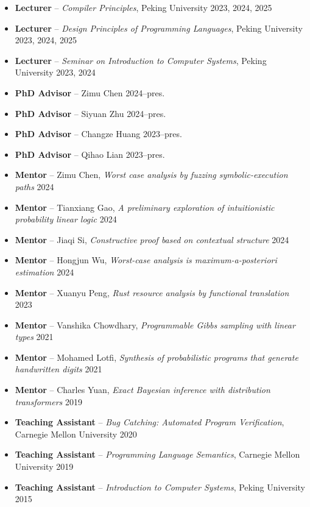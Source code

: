 \documentclass[11pt,letterpaper,sans]{moderncv}        %
\begin{document}
\begin{itemize}
  \item \textbf{Lecturer} -- \emph{Compiler Principles}, Peking University \hfill 2023, 2024, 2025
  \item \textbf{Lecturer} -- \emph{Design Principles of Programming Languages}, Peking University \hfill 2023, 2024, 2025
  \item \textbf{Lecturer} -- \emph{Seminar on Introduction to Computer Systems}, Peking University \hfill 2023, 2024

  \vspace{4pt}

  \item \textbf{PhD Advisor} -- Zimu Chen \hfill 2024--pres.
  \item \textbf{PhD Advisor} -- Siyuan Zhu \hfill 2024--pres.
  \item \textbf{PhD Advisor} -- Changze Huang \hfill 2023--pres.
  \item \textbf{PhD Advisor} -- Qihao Lian \hfill 2023--pres.

  \vspace{4pt}

  \item \textbf{Mentor} -- Zimu Chen, \emph{Worst case analysis by fuzzing symbolic-execution paths} \hfill 2024
  \item \textbf{Mentor} -- Tianxiang Gao, \emph{A preliminary exploration of intuitionistic probability linear logic} \hfill 2024
  \item \textbf{Mentor} -- Jiaqi Si, \emph{Constructive proof based on contextual structure} \hfill 2024
  \item \textbf{Mentor} -- Hongjun Wu, \emph{Worst-case analysis is maximum-a-posteriori estimation} \hfill 2024
  \item \textbf{Mentor} -- Xuanyu Peng, \emph{Rust resource analysis by functional translation} \hfill 2023
  \item \textbf{Mentor} -- Vanshika Chowdhary, \emph{Programmable Gibbs sampling with linear types} \hfill 2021
  \item \textbf{Mentor} -- Mohamed Lotfi, \emph{Synthesis of probabilistic programs that generate handwritten digits} \hfill 2021
  \item \textbf{Mentor} -- Charles Yuan, \emph{Exact Bayesian inference with distribution transformers} \hfill 2019

  \vspace{4pt}

  \item \textbf{Teaching Assistant} -- \emph{Bug Catching: Automated Program Verification}, Carnegie Mellon University \hfill 2020
  \item \textbf{Teaching Assistant} -- \emph{Programming Language Semantics}, Carnegie Mellon University \hfill 2019
  \item \textbf{Teaching Assistant} -- \emph{Introduction to Computer Systems}, Peking University \hfill 2015
\end{itemize}
\end{document}
